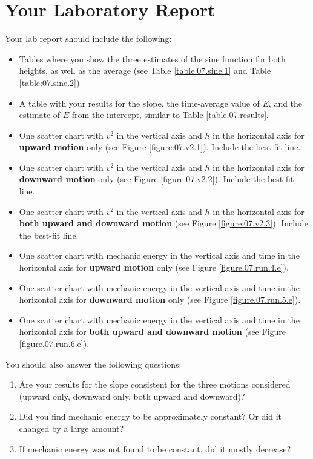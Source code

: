 \section{Your Laboratory Report}
%
Your lab report should include the following:
\begin{itemize}
    \item Tables where you show the three estimates of the sine function for both heights, as well as the average (see Table \ref{table:07.sine.1} and Table \ref{table:07.sine.2})
    \item A table with your results for the slope, the time-average value of $E$, and the estimate of $E$ from the intercept, similar to Table \ref{table.07.results}.
    \item One scatter chart with $v^{2}$ in the vertical axis and $h$ in the horizontal axis for \textbf{upward motion} only (see Figure \ref{figure:07.v2.1}). Include the best-fit line.
    \item One scatter chart with $v^{2}$ in the vertical axis and $h$ in the horizontal axis for \textbf{downward motion} only (see Figure \ref{figure:07.v2.2}). Include the best-fit line.
    \item One scatter chart with $v^{2}$ in the vertical axis and $h$ in the horizontal axis for \textbf{both upward and downward motion} (see Figure \ref{figure:07.v2.3}). Include the best-fit line.
    \item One scatter chart with mechanic energy in the vertical axis and time in the horizontal axis for \textbf{upward motion} only (see Figure \ref{figure.07.run.4.e}).
    \item One scatter chart with mechanic energy in the vertical axis and time in the horizontal axis for \textbf{downward motion} only (see Figure \ref{figure.07.run.5.e}).
    \item One scatter chart with mechanic energy in the vertical axis and time in the horizontal axis for \textbf{both upward and downward motion} (see Figure \ref{figure.07.run.6.e}).
\end{itemize}
You should also answer the following questions:
\begin{enumerate}
    \item Are your results for the slope consistent for the three motions considered (upward only, downward only, both upward and downward)?
    \item Did you find mechanic energy to be approximately constant? Or did it changed by a large amount?
    \item If mechanic energy was not found to be constant, did it mostly decrease?
\end{enumerate}
%
\FloatBarrier
\newpage
